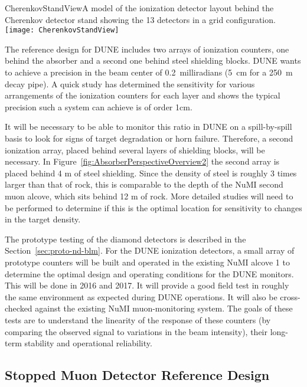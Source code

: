 \begin{cdrfigure}{CherenkovStandView}{A model of the ionization detector layout behind the Cherenkov detector stand showing the 13 detectors in a grid configuration.}
\texttt{[image: CherenkovStandView]}

\end{cdrfigure}

The reference design for DUNE includes two arrays of ionization counters, one 
behind the absorber and a second one behind steel shielding blocks. 
DUNE wants to achieve a precision in the beam center of 0.2~milliradians
(5~cm for a 250~m decay pipe). A quick study has 
determined the sensitivity for various arrangements of the ionization counters for each layer and
shows the typical precision such a system can achieve is of order 1cm.

It will be necessary to be able to monitor this ratio in DUNE on a spill-by-spill 
basis to look for signs of target degradation or horn failure.  
Therefore, a second ionization array, placed behind several layers of 
shielding blocks, will be necessary.  In Figure~\ref{fig:AbsorberPerspectiveOverview2}
the second array is placed behind 4 m of steel shielding.  
Since the density of steel is roughly 3 times larger than that of rock, 
this is comparable to the depth of the NuMI second muon alcove, which sits behind 12 m of rock.  
More detailed studies will need to be performed to determine 
if this is the optimal location for sensitivity to changes in the target density.

The prototype testing of the diamond detectors is described in the 
Section~\ref{sec:proto-nd-blm}. For the DUNE ionization detectors, a small array of prototype
counters will be built and operated in the existing NuMI
alcove 1 to determine the optimal design and operating conditions for
the DUNE monitors. This will be done in 2016 and 2017. 
It will provide a good field test in roughly the same environment as expected during DUNE
operations. It will also be cross-checked against the existing NuMI
muon-monitoring system.  The goals of these tests are to understand the linearity 
of the response of these counters (by comparing the observed signal to variations in the beam intensity), their long-term stability and operational reliability.  


%
%
\subsection{Stopped Muon Detector Reference Design} %
\label{subsec:detectors-nd-blm-stopped-mu}


